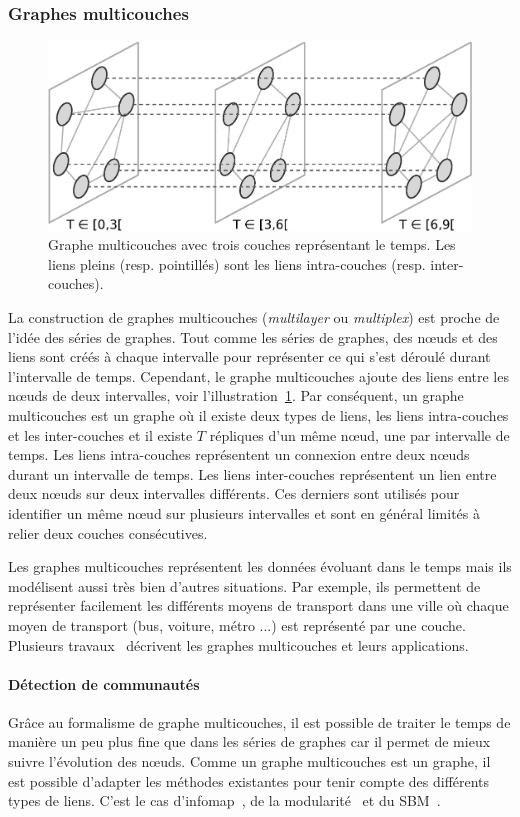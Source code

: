 \subsubsection{Graphes multicouches}
\begin{figure}[h]
\centering
\includegraphics[width=0.7\linewidth]{img/Intro/multiplex.eps}
\caption{Graphe multicouches avec trois couches représentant le temps.
Les liens pleins (resp. pointillés) sont les liens intra-couches (resp. inter-couches).}
\label{fig:exemple_multiplex}
\end{figure}
La construction de graphes multicouches (\emph{multilayer} ou \emph{multiplex}) est proche de l'idée des séries de graphes.
Tout comme les séries de graphes, des n\oe{}uds et des liens sont créés à chaque intervalle pour représenter ce qui s'est déroulé durant l'intervalle de temps.
Cependant, le graphe multicouches ajoute des liens entre les n\oe{}uds de deux intervalles, voir l'illustration~\ref{fig:exemple_multiplex}.
Par conséquent, un graphe multicouches est un graphe où il existe deux types de liens, les liens intra-couches et les inter-couches et il existe $T$ répliques d'un même n\oe{}ud, une par intervalle de temps.
Les liens intra-couches représentent un connexion entre deux n\oe{}uds durant un intervalle de temps.
Les liens inter-couches représentent un lien entre deux n\oe{}uds sur deux intervalles différents.
Ces derniers sont utilisés pour identifier un même n\oe{}ud sur plusieurs intervalles et sont en général limités à relier deux couches consécutives.

Les graphes multicouches représentent les données évoluant dans le temps mais ils modélisent aussi très bien d'autres situations.
Par exemple, ils permettent de représenter facilement les différents moyens de transport dans une ville où chaque moyen de transport (bus, voiture, métro ...) est représenté par une couche.
Plusieurs travaux~\cite{DeDomenico2013,Kivela2014,Boccaletti2014} décrivent les graphes multicouches et leurs applications.



\paragraph{Détection de communautés}
Grâce au formalisme de graphe multicouches, il est possible de traiter le temps de manière un peu plus fine que dans les séries de graphes car il permet de mieux suivre l'évolution des n\oe{}uds.
Comme un graphe multicouches est un graphe, il est possible d'adapter les méthodes existantes pour tenir compte des différents types de liens.
C'est le cas d'infomap~\cite{DeDomenico2014}, de la modularité~\cite{Mucha2010,Bassett2013,Bazzi2016} et du SBM~\cite{Stanley,Peixoto2015c}.


